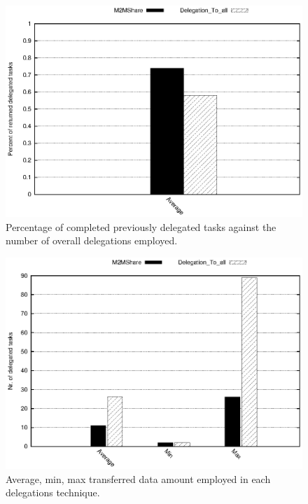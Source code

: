 \begin{figure}[htbp]
\centering
\includegraphics{grafici/percDeleghe.eps}
\caption{Percentage of completed previously delegated tasks against the number of overall delegations employed.}
\label{graficoPercDelegheRitornate}
\end{figure}

\begin{figure}[htbp]
\centering
\includegraphics{grafici/delegheFatte.eps}
\caption{Average, min, max transferred data amount employed in each delegations technique.}
\label{graficoDataDiverseDel}
\end{figure}


